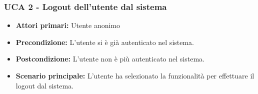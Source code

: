 \subsubsection{UCA 2 - Logout dell'utente dal sistema}%
\begin{itemize}
\item \textbf{Attori primari:} Utente anonimo
\item \textbf{Precondizione:} L'utente si è già autenticato nel sistema.
\item \textbf{Postcondizione:}  L'utente non è più autenticato nel sistema.
\item \textbf{Scenario principale:} L'utente ha selezionato la funzionalità per effettuare il logout dal sistema.
\end{itemize}